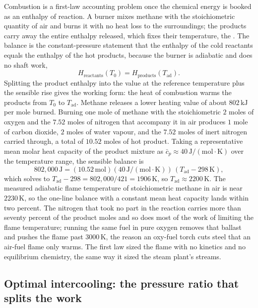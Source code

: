 Combustion is a first-law accounting problem once the chemical energy is
booked as an enthalpy of reaction. A burner mixes methane with the
stoichiometric quantity of air and burns it with no heat loss to the
surroundings; the products carry away the entire enthalpy released, which
fixes their temperature, the . The
balance is the constant-pressure statement that the enthalpy of the cold
reactants equals the enthalpy of the hot products, because the burner is
adiabatic and does no shaft work,
\[
H_{\text{reactants}}(T_0) = H_{\text{products}}(T_{\text{ad}}).
\]
Splitting the product enthalpy into the value at the reference temperature
plus the sensible rise gives the working form: the heat of combustion warms
the products from $T_0$ to $T_{\text{ad}}$. Methane releases a lower heating
value of about $802\,\text{kJ}$ per mole burned. Burning one mole of methane
with the stoichiometric $2$ moles of oxygen and the $7.52$ moles of nitrogen
that accompany it in air produces $1$ mole of carbon dioxide, $2$ moles of
water vapour, and the $7.52$ moles of inert nitrogen carried through, a total
of $10.52$ moles of hot product. Taking a representative mean molar heat
capacity of the product mixture as $\bar c_p \approx 40\,\text{J}/(\text{mol}
\cdot\si{\kelvin})$ over the temperature range, the sensible balance is
\[
802{,}000\,\text{J} = (10.52\,\text{mol})(40\,\text{J}/(\text{mol}\cdot
\si{\kelvin}))\,(T_{\text{ad}} - 298\,\si{\kelvin}),
\]
which solves to $T_{\text{ad}} - 298 = 802{,}000/421 = 1906\,\si{\kelvin}$,
so $T_{\text{ad}} \approx 2200\,\si{\kelvin}$. The measured adiabatic flame
temperature of stoichiometric methane in air is near $2230\,\si{\kelvin}$, so
the one-line balance with a constant mean heat capacity lands within two
percent. The nitrogen that took no part in the reaction carries more than
seventy percent of the product moles and so does most of the work of limiting
the flame temperature; running the same fuel in pure oxygen removes that
ballast and pushes the flame past $3000\,\si{\kelvin}$, the reason an
oxy-fuel torch cuts steel that an air-fuel flame only warms. The first law
sized the flame with no kinetics and no equilibrium chemistry, the same way
it sized the steam plant's streams.

\subsection{Optimal intercooling: the pressure ratio that splits the work}

